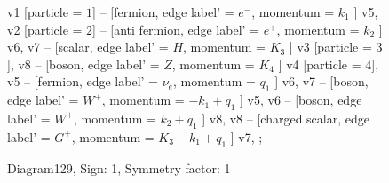 \documentclass{revtex4}
\begin{document}
\begin{figure}[!htb]
\begin{center}
{    %
v1 [particle = \(1\)] -- [fermion, edge label' = \(e^{-}\), momentum = \(k_{1}\) ] v5, 
v2 [particle = \(2\)] -- [anti fermion, edge label' = \(e^{+}\), momentum = \(k_{2}\) ] v6, 
v7 -- [scalar, edge label' = \(H\), momentum = \(K_{3}\) ] v3 [particle = \(3\)], 
v8 -- [boson, edge label' = \(Z\), momentum = \(K_{4}\) ] v4 [particle = \(4\)], 
v5 -- [fermion, edge label' = \(\nu_{e}\), momentum = \(q_{1}\) ] v6, 
v7 -- [boson, edge label' = \(W^{+}\), momentum = \(-k_{1} + q_{1}\) ] v5, 
v6 -- [boson, edge label' = \(W^{+}\), momentum = \(k_{2} + q_{1}\) ] v8, 
v8 -- [charged scalar, edge label' = \(G^{+}\), momentum = \(K_{3} - k_{1} + q_{1}\) ] v7, 
};
\end{center}
\caption{Diagram129, Sign: 1, Symmetry factor: 1}
\end{figure}
\newpage
\end{document}
